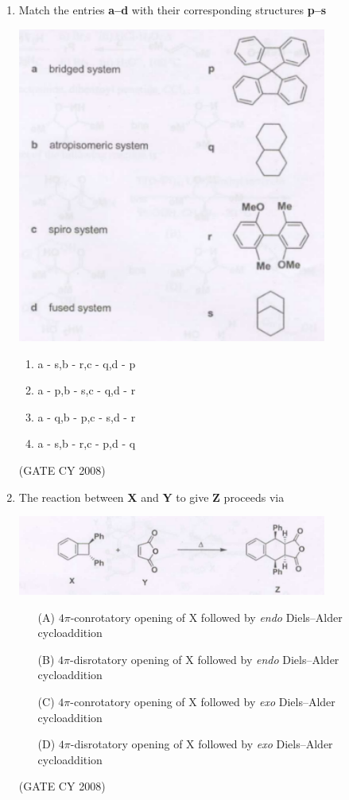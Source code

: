 \documentclass[12pt]{article}
\begin{document}
\begin{enumerate}
\item Match the entries \textbf{a–d} with their corresponding structures \textbf{p–s}

\begin{center}
    \includegraphics[width=0.8\textwidth]{figs/q37.png}
\end{center}
\begin{enumerate}
    \item a - s,\quad b - r,\quad c - q,\quad d - p
    \item a - p,\quad b - s,\quad c - q,\quad d - r
    \item a - q,\quad b - p,\quad c - s,\quad d - r
    \item a - s,\quad b - r,\quad c - p,\quad d - q
\end{enumerate}    \hfill{(GATE CY 2008)}


\item The reaction between \textbf{X} and \textbf{Y} to give \textbf{Z} proceeds via

\begin{center}
    \includegraphics[width=0.8\textwidth]{figs/q38.png}
\end{center}
\begin{enumerate}
    \item [(A)]$4\pi$-conrotatory opening of X followed by \textit{endo} Diels--Alder cycloaddition
    \item [(B)]$4\pi$-disrotatory opening of X followed by \textit{endo} Diels--Alder cycloaddition
    \item [(C)]$4\pi$-conrotatory opening of X followed by \textit{exo} Diels--Alder cycloaddition
    \item [(D)] $4\pi$-disrotatory opening of X followed by \textit{exo} Diels--Alder cycloaddition
\end{enumerate}    \hfill{(GATE CY 2008)}



\end{enumerate}
\end{document}
